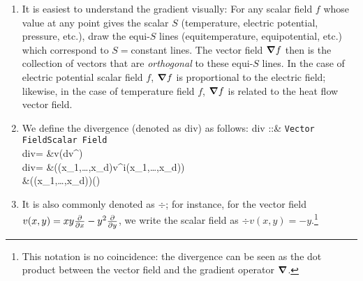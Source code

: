 {\begin{enumerate}
	\item It is easiest to understand the gradient visually: For any scalar field $f$ whose value at any point gives the scalar $S$ (temperature, electric potential, pressure, etc.), draw the equi-$S$ lines (equitemperature, equipotential, etc.) which correspond to $S=$constant lines. The vector field $\grad{f}$ then is the collection of vectors that are \emph{orthogonal} to these equi-$S$ lines. In the case of electric potential scalar field $f$, $\grad{f}$ is proportional to the electric field; likewise, in the case of temperature field $f$, $\grad{f}$ is related to the heat flow vector field.
	\item We define the divergence (denoted as \textsf{div}) as follows:
	\be 
	\textsf{div} ::{}&{} \texttt{Vector Field}\to\texttt{Scalar Field}\\
	\textsf{div}= {}&{}v\to \big(\star d\star v^\Flat\big)\\
	\textsf{div}= {}&{}\big((x_1,\dots,x_d)\to v^i(x_1,\dots,x_d)\big)\\
	&\quad\to \left((x_1,\dots,x_d)\to {}\right)\quad()
	\ee 
	\item It is also commonly denoted as $\div{}$; for instance, for the vector field $v(x,y)=xy\frac{\partial }{\partial x}-y^2\frac{\partial }{\partial y}$, we write the scalar field as \mbox{$\div v(x,y)=-y$}.\footnote{This notation is no coincidence: the divergence can be seen as the dot product between the vector field and the gradient operator $\grad$.}

\end{enumerate}}
